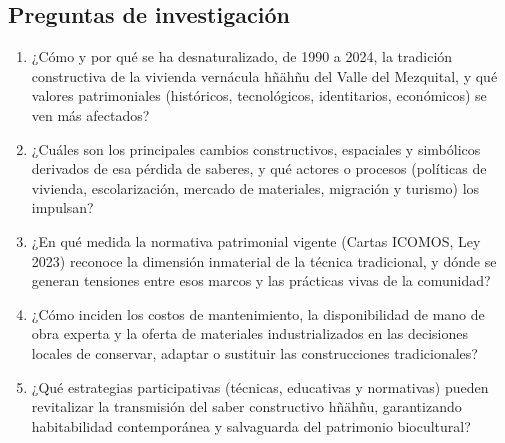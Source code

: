 \subsection{Preguntas de investigación}

\begin{enumerate}
	\item {¿Cómo y por qué se ha desnaturalizado, de 1990 a 2024, la tradición constructiva de la vivienda vernácula hñähñu del Valle del Mezquital, y qué valores patrimoniales (históricos, tecnológicos, identitarios, económicos) se ven más afectados?}

	\item {¿Cuáles son los principales cambios constructivos, espaciales y simbólicos derivados de esa pérdida de saberes, y qué actores o procesos (políticas de vivienda, escolarización, mercado de materiales, migración y turismo) los impulsan?}

	\item {¿En qué medida la normativa patrimonial vigente (Cartas ICOMOS, Ley 2023) reconoce la dimensión inmaterial de la técnica tradicional, y dónde se generan tensiones entre esos marcos y las prácticas vivas de la comunidad?}

	\item {¿Cómo inciden los costos de mantenimiento, la disponibilidad de mano de obra experta y la oferta de materiales industrializados en las decisiones locales de conservar, adaptar o sustituir las construcciones tradicionales?}

	\item {¿Qué estrategias participativas (técnicas, educativas y normativas) pueden revitalizar la transmisión del saber constructivo hñähñu, garantizando habitabilidad contemporánea y salvaguarda del patrimonio biocultural?}
\end{enumerate}
